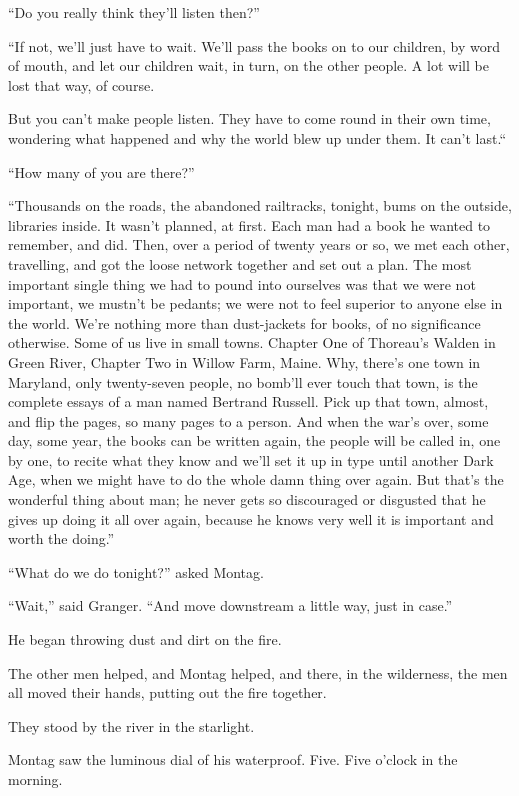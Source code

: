 \documentclass[11pt,openany]{book}
\begin{document}
``Do you really think they'll listen then?''

``If not, we'll just have to wait. We'll pass the books on to our children, by word of mouth, and let our children wait, in turn, on the other people. A lot will be lost that way, of course.

But you can't make people listen. They have to come round in their own time, wondering what happened and why the world blew up under them. It can't last.``

``How many of you are there?''

``Thousands on the roads, the abandoned railtracks, tonight, bums on the outside, libraries inside. It wasn't planned, at first. Each man had a book he wanted to remember, and did. Then, over a period of twenty years or so, we met each other, travelling, and got the loose network together and set out a plan. The most important single thing we had to pound into ourselves was that we were not important, we mustn't be pedants; we were not to feel superior to anyone else in the world. We're nothing more than dust-jackets for books, of no significance otherwise. Some of us live in small towns. Chapter One of Thoreau's Walden in Green River, Chapter Two in Willow Farm, Maine. Why, there's one town in Maryland, only twenty-seven people, no bomb'll ever touch that town, is the complete essays of a man named Bertrand Russell. Pick up that town, almost, and flip the pages, so many pages to a person. And when the war's over, some day, some year, the books can be written again, the people will be called in, one by one, to recite what they know and we'll set it up in type until another Dark Age, when we might have to do the whole damn thing over again. But that's the wonderful thing about man; he never gets so discouraged or disgusted that he gives up doing it all over again, because he knows very well it is important and worth the doing.''

``What do we do tonight?'' asked Montag.

``Wait,'' said Granger. ``And move downstream a little way, just in case.''

He began throwing dust and dirt on the fire.

The other men helped, and Montag helped, and there, in the wilderness, the men all moved their hands, putting out the fire together.

They stood by the river in the starlight.

Montag saw the luminous dial of his waterproof. Five. Five o'clock in the morning.
\end{document}
